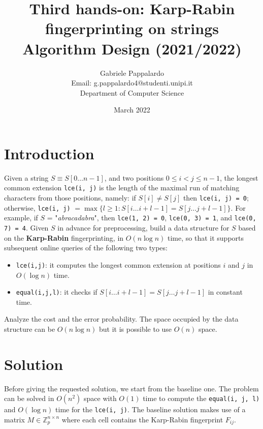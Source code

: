 \documentclass{article}
\title{Third hands-on: Karp-Rabin fingerprinting on strings \\[1ex] \large Algorithm Design (2021/2022)}
\author{Gabriele Pappalardo\\Email: g.pappalardo4@studenti.unipi.it\\Department of Computer Science}
\date{March 2022}
\begin{document}
\maketitle

\section{Introduction}

Given a string $S \equiv S[0 \dots n - 1]$, and two positions $0 \le i < j \le n − 1$, the longest common extension \verb+lce(i, j)+ is the length of the maximal run of matching characters from those positions, namely: if $S[i] \ne S[j]$ then \verb+lce(i, j) = 0+; otherwise, \verb+lce(i, j)+ $= \max \{l \ge 1 : S[i \dots i + l − 1] = S[j \dots j + l − 1]\}$. For example, if $S$ = "\textit{abracadabra}", then \verb+lce(1, 2) = 0+, \verb+lce(0, 3) = 1+, and \verb+lce(0, 7) = 4+. Given $S$ in advance for preprocessing, build a data structure for $S$ based on the \textbf{Karp-Rabin} fingerprinting, in $O(n \log n)$ time, so that it supports subsequent online queries of the following two types: 

\begin{itemize}
    \item \verb+lce(i,j)+: it computes the longest common extension at positions $i$ and $j$ in $O(\log n)$ time. 
    \item \verb+equal(i,j,l)+: it checks if $S[i \dots i+l−1]=S[j \dots j+l{−}1]$ in constant time. 
\end{itemize}

\noindent Analyze the cost and the error probability. The space occupied by the data structure can be $O(n \log n)$ but it is possible to use $O(n)$ space.  

\section{Solution}

Before giving the requested solution, we start from the baseline one. The problem can be solved in $O(n^2)$ space with $O(1)$ time to compute the \verb+equal(i, j, l)+ and $O(\log n)$ time for the \verb+lce(i, j)+. The baseline solution makes use of a matrix $M \in \mathbb{Z}_p^{n \times n}$ where each cell contains the Karp-Rabin fingerprint $F_{ij}$.
\end{document}
